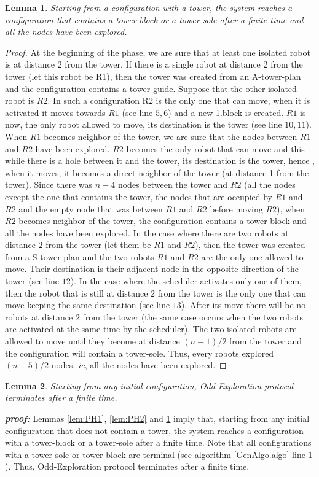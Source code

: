 \documentclass[12pt]{llncs}
\newtheorem{lem}{Lemma}
\begin{document}
\begin{lem}
\label{lem:PH3}
Starting from a configuration with a tower, the system reaches a configuration that contains a tower-block or a tower-sole after a finite time and all the nodes have been explored. 
\end{lem}  

\begin{proof}
At the beginning of the phase, we are sure that at least one isolated robot is at distance $2$ from the tower. If there is a single robot at distance $2$ from the tower (let this robot be R1), then the tower was created from an A-tower-plan and the configuration contains a tower-guide. Suppose that the other isolated robot is $R2$. In such a configuration R2 is the only one that can move, when it is activated it moves towards $R1$ (see line $5,6$) and a new 1.block is created. $R1$ is now, the only robot allowed to move, its destination is the tower (see line $10,11$). When $R1$ becomes neighbor of the tower, we are sure that the nodes between $R1$ and $R2$ have been explored. $R2$ becomes the only robot that can move and this while there is a hole between it and the tower, its destination is the tower, hence , when it moves, it becomes a direct neighbor of the tower (at distance 1 from the tower). Since there was $n-4$ nodes between the tower and $R2$ (all the nodes except the one that contains the tower, the nodes that are occupied by $R1$ and $R2$ and the empty node that was between $R1$ and $R2$ before moving $R2$), when $R2$ becomes neighbor of the tower, the configuration contains a tower-block and all the nodes have been explored.
In the case where there are two robots at distance $2$ from the tower (let them be $R1$ and $R2$), then the tower was created from a S-tower-plan and the two robots $R1$ and $R2$ are the only one allowed to move. Their destination is their adjacent node in the opposite direction of the tower (see line $12$). In the case where the scheduler activates only one of them, then the robot that is still at distance $2$ from the tower is the only one that can move keeping the same destination (see line $13$). After its move there will be no robots at distance $2$ from the tower (the same case occurs when the two robots are activated at the same time by the scheduler). The two isolated robots are allowed to move until they become at distance $(n-1)/2$ from the tower and the configuration will contain a tower-sole. Thus, every robots explored $(n-5)/2$ nodes, \textit{ie}, all the nodes have been explored. 
\end{proof} 


\begin {lem}
Starting from any initial configuration, Odd-Exploration protocol terminates after a finite time.
\end {lem}
\textit{\textbf{proof:}}
Lemmas \ref{lem:PH1}, \ref{lem:PH2}  and \ref{lem:PH3} imply that, starting from any initial configuration that does not contain a tower, the system reaches a configuration with a tower-block or a tower-sole after a finite time. Note that all configurations with a tower sole or tower-block  are terminal (see algorithm \ref{GenAlgo.algo} line $1$). Thus, Odd-Exploration protocol terminates after a finite time. 
\end{document}

